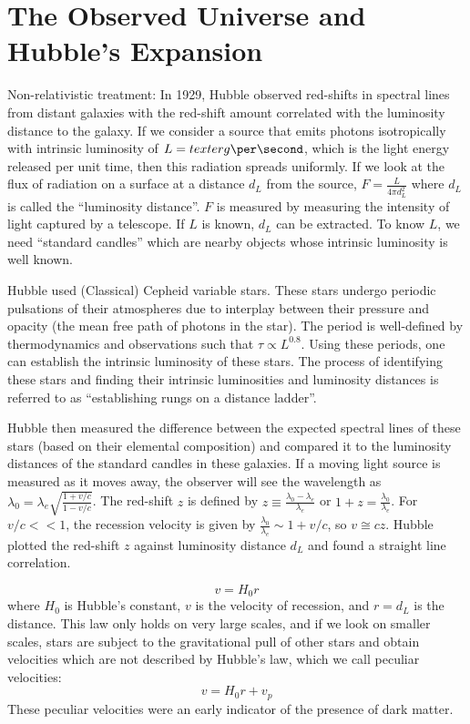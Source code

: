 \documentclass[a4paper,twoside,master.tex]{subfiles}
\begin{document}
\section{The Observed Universe and Hubble's Expansion}\label{sec:the_observed_universe_and_hubble's_expansion}

Non-relativistic treatment: In 1929, Hubble observed red-shifts in spectral lines from distant galaxies with the red-shift amount correlated with the luminosity distance to the galaxy. If we consider a source that emits photons isotropically with intrinsic luminosity of $ L = \\text{erg}\per\second $, which is the light energy released per unit time, then this radiation spreads uniformly. If we look at the flux of radiation on a surface at a distance $ d_L $ from the source, $ F = \frac{L}{4 \pi d_L^2} $ where $ d_L $ is called the ``luminosity distance''. $ F $ is measured by measuring the intensity of light captured by a telescope. If $ L $ is known, $ d_L $ can be extracted. To know $ L $, we need ``standard candles'' which are nearby objects whose intrinsic luminosity is well known.

Hubble used (Classical) Cepheid variable stars. These stars undergo periodic pulsations of their atmospheres due to interplay between their pressure and opacity (the mean free path of photons in the star). The period is well-defined by thermodynamics and observations such that $ \tau \propto L^{0.8} $. Using these periods, one can establish the intrinsic luminosity of these stars. The process of identifying these stars and finding their intrinsic luminosities and luminosity distances is referred to as ``establishing rungs on a distance ladder''.

Hubble then measured the difference between the expected spectral lines of these stars (based on their elemental composition) and compared it to the luminosity distances of the standard candles in these galaxies. If a moving light source is measured as it moves away, the observer will see the wavelength as $ \lambda_0 = \lambda_e \sqrt{\frac{1 + v/c}{1 - v/c}} $. The red-shift $ z $ is defined by $ z \equiv \frac{\lambda_0 - \lambda_e}{\lambda_e} $ or $ 1 + z = \frac{\lambda_0}{\lambda_e} $. For $ v/c << 1 $, the recession velocity is given by $ \frac{\lambda_0}{\lambda_e} \sim 1 + v/c $, so $ v \cong cz $. Hubble plotted the red-shift $ z $ against luminosity distance $ d_L $ and found a straight line correlation.

\begin{equation}
    v = H_0 r \tag{Hubble's Law of Universal Expansion}
\end{equation}
where $ H_0 $ is Hubble's constant, $ v $ is the velocity of recession, and $ r = d_L $ is the distance. This law only holds on very large scales, and if we look on smaller scales, stars are subject to the gravitational pull of other stars and obtain velocities which are not described by Hubble's law, which we call peculiar velocities:
\begin{equation}
    v = H_0 r + v_p
\end{equation}
These peculiar velocities were an early indicator of the presence of dark matter.
\end{document}
